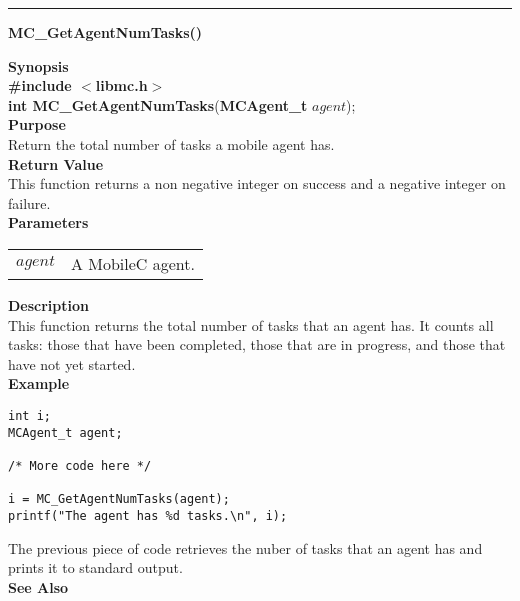 \noindent
\vspace{5pt}
\rule{6.5in}{0.015in}
\noindent
{\LARGE \bf MC\_GetAgentNumTasks()}\\
{}

\noindent
{\bf Synopsis}\\
{\bf \#include $<$libmc.h$>$}\\
{\bf int MC\_GetAgentNumTasks}({\bf MCAgent\_t} $agent$);\\

\noindent
{\bf Purpose}\\
Return the total number of tasks a mobile agent has. \\

\noindent
{\bf Return Value}\\
This function returns a non negative integer on success and a negative 
integer on failure.\\

\noindent
{\bf Parameters}
\vspace{-0.1in}
\begin{description}
\item               
\begin{tabular}{p{10 mm}p{145 mm}}
$agent$ & A MobileC agent. 
\end{tabular}
\end{description}

\noindent
{\bf Description}\\
This function returns the total number of tasks that an agent has. 
It counts all tasks: those that have been completed, those that are in 
progress, and those that have not yet started.\\

\noindent
{\bf Example}
\begin{verbatim}
int i;
MCAgent_t agent;

/* More code here */

i = MC_GetAgentNumTasks(agent);
printf("The agent has %d tasks.\n", i);
\end{verbatim}

\noindent
The previous piece of code retrieves the nuber of tasks that an agent has and
prints it to standard output.\\

\noindent
{\bf See Also}\\


